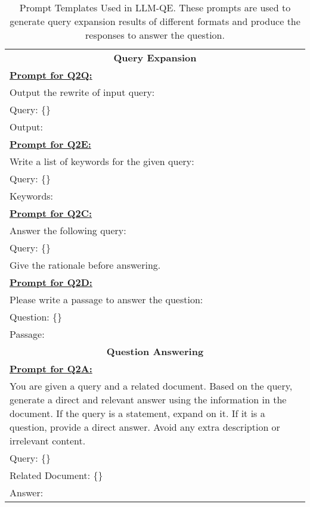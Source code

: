\begin{table}[t]
\small
{}
\setlength{\arrayrulewidth}{0.7pt}
\begin{tabular}{|p{}|}
\hline  
\multicolumn{1}{|c|}{\cellcolor{titlecolor}\textbf{Query Expansion}} \\
\uline{\textbf{Prompt for Q2Q:}} \\
Output the rewrite of input query:\\
Query: \{\}\\
Output:\\
\uline{\textbf{Prompt for Q2E:}} \\
Write a list of keywords for the given query:\\
Query: \{\}\\
Keywords:\\
\uline{\textbf{Prompt for Q2C:}} \\
Answer the following query:\\
Query: \{\}\\
Give the rationale before answering.\\
\uline{\textbf{Prompt for Q2D:}} \\
Please write a passage to answer the question:\\
Question: \{\}\\
Passage:\\
\hline
\multicolumn{1}{|c|}{\cellcolor{titlecolor}\textbf{Question Answering}} \\
\uline{\textbf{Prompt for Q2A:}} \\
You are given a query and a related document. Based on the query, generate a direct and relevant answer using the information in the document. If the query is a statement, expand on it. If it is a question, provide a direct answer. Avoid any extra description or irrelevant content.\\
Query: \{\}\\
Related Document: \{\}\\
Answer:\\

\hline
\end{tabular}
\caption{Prompt Templates Used in LLM-QE. These prompts are used to generate query expansion results of different formats and produce the responses to answer the question.}
\label{tab:prompt_template}
\end{table}